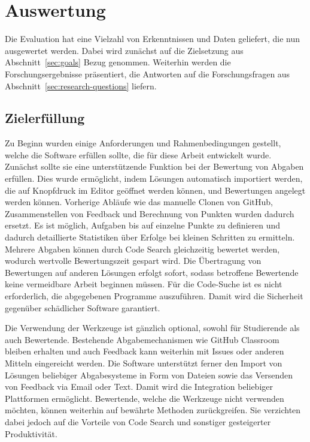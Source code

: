 \chapter{Auswertung}\label{ch:results}

Die Evaluation hat eine Vielzahl von Erkenntnissen und Daten geliefert, die nun ausgewertet werden.
Dabei wird zunächst auf die Zielsetzung aus Abschnitt~\ref{sec:goals} Bezug genommen.
Weiterhin werden die Forschungsergebnisse präsentiert, die Antworten auf die Forschungsfragen aus Abschnitt~\ref{sec:research-questions} liefern.

\section{Zielerfüllung}\label{sec:goals-reached}

Zu Beginn wurden einige Anforderungen und Rahmenbedingungen gestellt, welche die Software erfüllen sollte, die für diese Arbeit entwickelt wurde.
Zunächst sollte sie eine unterstützende Funktion bei der Bewertung von Abgaben erfüllen.
Dies wurde ermöglicht, indem Lösungen automatisch importiert werden, die auf Knopfdruck im Editor geöffnet werden können, und Bewertungen angelegt werden können.
Vorherige Abläufe wie das manuelle Clonen von GitHub, Zusammenstellen von Feedback und Berechnung von Punkten wurden dadurch ersetzt.
Es ist möglich, Aufgaben bis auf einzelne Punkte zu definieren und dadurch detaillierte Statistiken über Erfolge bei kleinen Schritten zu ermitteln.
Mehrere Abgaben können durch Code Search gleichzeitig bewertet werden, wodurch wertvolle Bewertungszeit gespart wird.
Die Übertragung von Bewertungen auf anderen Lösungen erfolgt sofort, sodass betroffene Bewertende keine vermeidbare Arbeit beginnen müssen.
Für die Code-Suche ist es nicht erforderlich, die abgegebenen Programme auszuführen.
Damit wird die Sicherheit gegenüber schädlicher Software garantiert.

Die Verwendung der Werkzeuge ist gänzlich optional, sowohl für Studierende als auch Bewertende.
Bestehende Abgabemechanismen wie GitHub Classroom bleiben erhalten und auch Feedback kann weiterhin mit Issues oder anderen Mitteln eingereicht werden.
Die Software unterstützt ferner den Import von Lösungen beliebiger Abgabesysteme in Form von Dateien sowie das Versenden von Feedback via Email oder Text.
Damit wird die Integration beliebiger Plattformen ermöglicht.
Bewertende, welche die Werkzeuge nicht verwenden möchten, können weiterhin auf bewährte Methoden zurückgreifen.
Sie verzichten dabei jedoch auf die Vorteile von Code Search und sonstiger gesteigerter Produktivität.

